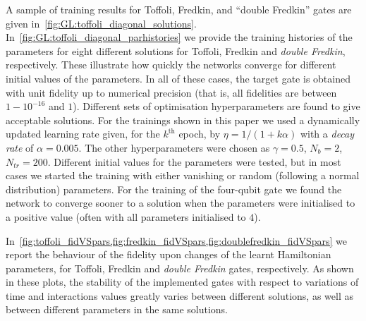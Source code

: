 



A sample of training results for Toffoli, Fredkin, and ``double Fredkin'' gates are given in~\cref{fig:GL:toffoli_diagonal_solutions}.
In~\cref{fig:GL:toffoli_diagonal_parhistories} we provide the training histories of the parameters for eight different solutions for Toffoli, Fredkin and \emph{double Fredkin}, respectively.
These illustrate how quickly the networks converge for different initial values of the parameters.
In all of these cases, the target gate is obtained with unit fidelity up to numerical precision (that is, all fidelities are between $1-10^{-16}$ and $1$).
Different sets of optimisation hyperparameters are found to give acceptable solutions.
For the trainings shown in this paper we used a dynamically updated learning rate given, for the $k^{\text{th}}$ epoch, by $\eta=1/(1 + k \alpha)$ with a \emph{decay rate} of $\alpha=0.005$.
The other hyperparameters were chosen as
$\gamma=0.5$, 
$N_b = 2$, $N_{tr} = 200$.
Different initial values for the parameters were tested, but in most cases we started the training with either vanishing or random (following a normal distribution) parameters.
For the training of the four-qubit gate we found the network to converge sooner to a solution when the parameters were initialised to a positive value (often with all parameters initialised to $4$).

In~\cref{fig:toffoli_fidVSpars,fig:fredkin_fidVSpars,fig:doublefredkin_fidVSpars} we report the behaviour of the fidelity upon changes of the learnt Hamiltonian parameters, for Toffoli, Fredkin and \emph{double Fredkin} gates, respectively.
As shown in these plots, the stability of the implemented gates with respect to variations of time and interactions values greatly varies between different solutions, as well as between different parameters in the same solutions.


